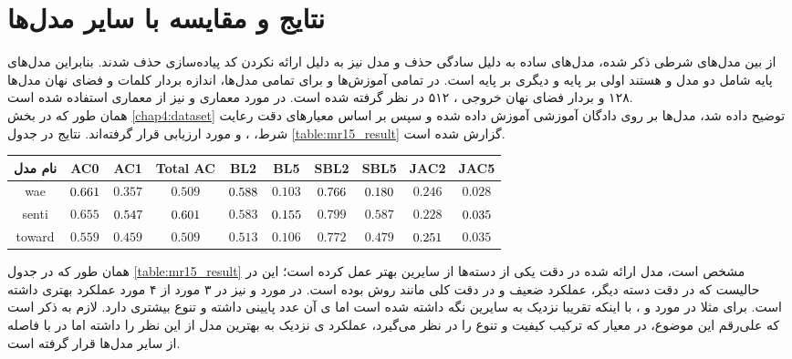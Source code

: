 \section{نتایج و مقایسه با سایر مدل‌ها}
از بین مدل‌های شرطی ذکر شده، مدل‌های ساده به دلیل سادگی حذف و مدل  نیز به دلیل ارائه نکردن کد پیاده‌سازی حذف شدند. بنابراین مدل‌های پایه شامل دو مدل \towardctg{} و \sentigan{} هستند اولی بر پایه \vae{} و دیگری بر پایه \gan{} است. در تمامی آموزش‌ها و برای تمامی مدل‌ها، اندازه بردار \embedding{} کلمات و فضای نهان مدل‌ها ۱۲۸ و بردار فضای نهان خروجی \encoder{}، ۵۱۲ در نظر گرفته شده است. در مورد معماری \encoder{} و \decoder{} نیز از معماری \transformer{} استفاده شده است.
\\
همان طور که در بخش \ref{chap4:dataset} توضیح داده شد، مدل‌ها بر روی دادگان آموزشی  آموزش داده شده و سپس بر اساس معیارهای  دقت رعایت شرط، \bleu{} ، \selfbleu{} و \jaccard{} مورد ارزیابی قرار گرفته‌اند. نتایج در جدول \ref{table:mr15_result} گزارش شده است.
\begin{table*}[!htb]
    \centering
    \caption{ارزیابی مدل‌های پایه و ارائه شده بر اساس معیار‌های مختلف}\label{table:mr15_result}
    \small\tabcolsep=0.07cm
    \begin{tabular}{||c||c c c|c c|c c|c c||}\hline\hline نام مدل	& AC0	& AC1	& Total AC	& BL2	& BL5	& SBL2	& SBL5	& JAC2	& JAC5\\
        \hline\hline
        wae	& $\cellcolor{gray!25}0.661$	& $0.357$	& $0.509$	& $\cellcolor{gray!25}0.588$	& $0.103$	& $\cellcolor{gray!25}0.766$	& $\cellcolor{gray!25}0.180$	& $0.246$	& $0.028$ \\
        \hline
        senti	& $0.655$	& $\cellcolor{gray!25}0.547$	& $\cellcolor{gray!25}0.601$	& $0.583$	& $\cellcolor{gray!25}0.155$	& $0.799$	& $0.587$	& $0.228$	& $\cellcolor{gray!25}0.035$ \\
        \hline
        toward	& $0.559$	& $0.459$	& $0.509$	& $0.513$	& $0.106$	& $0.772$	& $0.479$	& $\cellcolor{gray!25}0.251$	& $0.035$ \\
        \hline
        \hline\end{tabular}\normalsize 
\end{table*}
همان طور که در جدول \ref{table:mr15_result} مشخص است، مدل ارائه شده در دقت یکی از دسته‌ها از سایرین بهتر عمل کرده است؛ این در حالیست که در دقت دسته دیگر، عملکرد ضعیف و در دقت کلی مانند روش \towardctg{} بوده است. در مورد \bleu{} و \selfbleu{} نیز در ۳ مورد از ۴ مورد عملکرد بهتری داشته است. برای مثلا در مورد \bleu[-5]{} و \selfbleu[-5]{}، با اینکه \bleu{} تقریبا نزدیک به سایرین نگه داشته شده است اما \selfbleu{}ی آن عدد پایینی داشته و تنوع بیشتری دارد. لازم به ذکر است که علی‌رقم این موضوع، در معیار \jaccard{} که ترکیب کیفیت و تنوع را در نظر می‌گیرد، عملکرد \jaccard[-2]{}ی نزدیک به بهترین مدل از این نظر را داشته اما در \jaccard[-5]{} با فاصله از سایر مدل‌ها قرار گرفته است.

